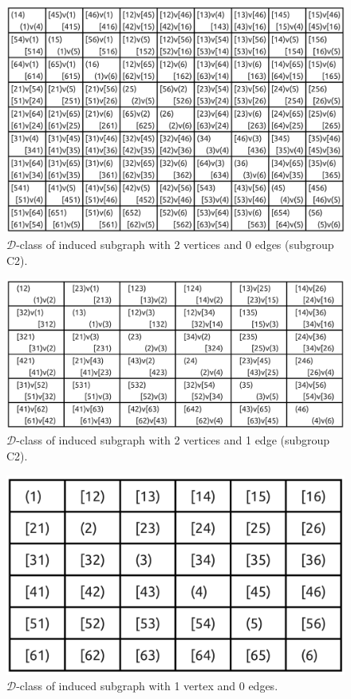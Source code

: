 \begin{appendices}
\begin{figure}[H]
\includegraphics[scale=0.08]{images/x1/x1_2v_0e.png}
\caption{$\mathcal{D}$-class of induced subgraph with 2 vertices and 0 edges (subgroup C2).}
\end{figure}

\begin{figure}[H]
\includegraphics[scale=0.06]{images/x1/x1_2v_1e.png}
\caption{$\mathcal{D}$-class of induced subgraph with 2 vertices and 1 edge (subgroup C2).}
\end{figure}

\begin{figure}[H]
\includegraphics[scale=0.06]{images/x1/x1_1v_0e.png}
\caption{$\mathcal{D}$-class of induced subgraph with 1 vertex and 0 edges.}
\end{figure}


\end{appendices}
